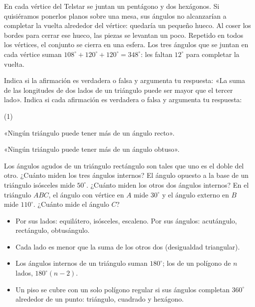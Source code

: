\documentclass[11pt]{article}
\begin{document}
\begin{aplicacion}
En cada vértice del Telstar se juntan un pentágono y dos hexágonos. Si quisiéramos ponerlos
planos sobre una mesa, sus ángulos no alcanzarían a completar la vuelta alrededor del vértice:
quedaría un pequeño hueco. Al coser los bordes para cerrar ese hueco, las piezas se levantan un
poco. Repetido en todos los vértices, el conjunto se cierra en una esfera. Los tres ángulos
que se juntan en cada vértice suman $108^\circ + 120^\circ + 120^\circ = 348^\circ$: les faltan
$12^\circ$ para completar la vuelta.
\end{aplicacion}

\begin{preguntas}
\pregunta Indica si la afirmación es verdadera o falsa y argumenta tu respuesta: «La suma de
las longitudes de dos lados de un triángulo puede ser mayor que el tercer lado».
\pregunta Indica si cada afirmación es verdadera o falsa y argumenta tu respuesta:
\begin{opciones*}(1)
  \item «Ningún triángulo puede tener más de un ángulo recto».
  \item «Ningún triángulo puede tener más de un ángulo obtuso».
\end{opciones*}
\pregunta Los ángulos agudos de un triángulo rectángulo son tales que uno es el doble del otro.
¿Cuánto miden los tres ángulos internos?
\espacio{2.5cm}
\pregunta El ángulo opuesto a la base de un triángulo isósceles mide $50^\circ$. ¿Cuánto miden
los otros dos ángulos internos?
\espacio{2.5cm}
\pregunta En el triángulo $ABC$, el ángulo con vértice en $A$ mide $30^\circ$ y el ángulo
externo en $B$ mide $110^\circ$. ¿Cuánto mide el ángulo $C$?
\espacio{2.5cm}
\end{preguntas}

\begin{resumen}
\begin{itemize}
  \item Por sus lados: equilátero, isósceles, escaleno. Por sus ángulos: acutángulo,
        rectángulo, obtusángulo.
  \item Cada lado es menor que la suma de los otros dos (desigualdad triangular).
  \item Los ángulos internos de un triángulo suman $180^\circ$; los de un polígono de $n$ lados,
        $180^\circ (n - 2)$.
  \item Un piso se cubre con un solo polígono regular si sus ángulos completan $360^\circ$
        alrededor de un punto: triángulo, cuadrado y hexágono.
\end{itemize}
\end{resumen}
\end{document}
